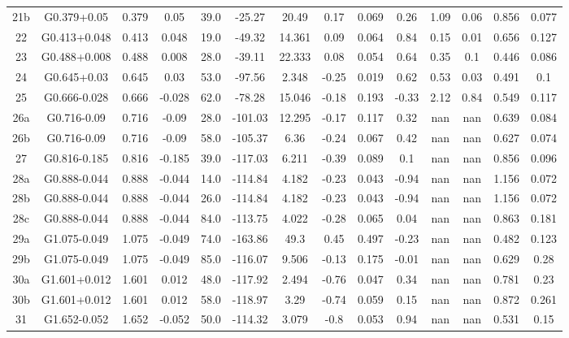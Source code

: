 \begin{table}
\begin{tabular}{cccccccccccccc}
21b & G0.379+0.05 & 0.379 & 0.05 & 39.0 & -25.27 & 20.49 & 0.17 & 0.069 & 0.26 & 1.09 & 0.06 & 0.856 & 0.077 \\
22 & G0.413+0.048 & 0.413 & 0.048 & 19.0 & -49.32 & 14.361 & 0.09 & 0.064 & 0.84 & 0.15 & 0.01 & 0.656 & 0.127 \\
23 & G0.488+0.008 & 0.488 & 0.008 & 28.0 & -39.11 & 22.333 & 0.08 & 0.054 & 0.64 & 0.35 & 0.1 & 0.446 & 0.086 \\
24 & G0.645+0.03 & 0.645 & 0.03 & 53.0 & -97.56 & 2.348 & -0.25 & 0.019 & 0.62 & 0.53 & 0.03 & 0.491 & 0.1 \\
25 & G0.666-0.028 & 0.666 & -0.028 & 62.0 & -78.28 & 15.046 & -0.18 & 0.193 & -0.33 & 2.12 & 0.84 & 0.549 & 0.117 \\
26a & G0.716-0.09 & 0.716 & -0.09 & 28.0 & -101.03 & 12.295 & -0.17 & 0.117 & 0.32 & nan & nan & 0.639 & 0.084 \\
26b & G0.716-0.09 & 0.716 & -0.09 & 58.0 & -105.37 & 6.36 & -0.24 & 0.067 & 0.42 & nan & nan & 0.627 & 0.074 \\
27 & G0.816-0.185 & 0.816 & -0.185 & 39.0 & -117.03 & 6.211 & -0.39 & 0.089 & 0.1 & nan & nan & 0.856 & 0.096 \\
28a & G0.888-0.044 & 0.888 & -0.044 & 14.0 & -114.84 & 4.182 & -0.23 & 0.043 & -0.94 & nan & nan & 1.156 & 0.072 \\
28b & G0.888-0.044 & 0.888 & -0.044 & 26.0 & -114.84 & 4.182 & -0.23 & 0.043 & -0.94 & nan & nan & 1.156 & 0.072 \\
28c & G0.888-0.044 & 0.888 & -0.044 & 84.0 & -113.75 & 4.022 & -0.28 & 0.065 & 0.04 & nan & nan & 0.863 & 0.181 \\
29a & G1.075-0.049 & 1.075 & -0.049 & 74.0 & -163.86 & 49.3 & 0.45 & 0.497 & -0.23 & nan & nan & 0.482 & 0.123 \\
29b & G1.075-0.049 & 1.075 & -0.049 & 85.0 & -116.07 & 9.506 & -0.13 & 0.175 & -0.01 & nan & nan & 0.629 & 0.28 \\
30a & G1.601+0.012 & 1.601 & 0.012 & 48.0 & -117.92 & 2.494 & -0.76 & 0.047 & 0.34 & nan & nan & 0.781 & 0.23 \\
30b & G1.601+0.012 & 1.601 & 0.012 & 58.0 & -118.97 & 3.29 & -0.74 & 0.059 & 0.15 & nan & nan & 0.872 & 0.261 \\
31 & G1.652-0.052 & 1.652 & -0.052 & 50.0 & -114.32 & 3.079 & -0.8 & 0.053 & 0.94 & nan & nan & 0.531 & 0.15 \\
\end{tabular}
\end{table}
